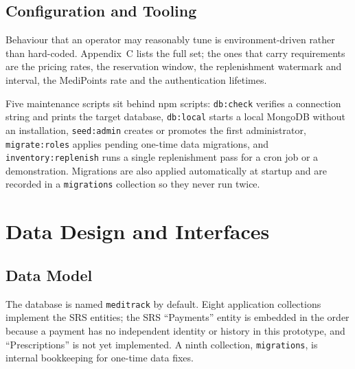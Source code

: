 \documentclass[11pt,a4paper]{article}
\begin{document}
\subsection{Configuration and Tooling}
Behaviour that an operator may reasonably tune is environment-driven rather than
hard-coded. Appendix~C lists the full set; the ones that carry requirements are the
pricing rates, the reservation window, the replenishment watermark and interval, the
MediPoints rate and the authentication lifetimes.

Five maintenance scripts sit behind npm scripts: \texttt{db:check} verifies a
connection string and prints the target database, \texttt{db:local} starts a local
MongoDB without an installation, \texttt{seed:admin} creates or promotes the first
administrator, \texttt{migrate:roles} applies pending one-time data migrations, and
\texttt{inventory:replenish} runs a single replenishment pass for a cron job or a
demonstration. Migrations are also applied automatically at startup and are recorded
in a \texttt{migrations} collection so they never run twice.

\section{Data Design and Interfaces}

\subsection{Data Model}
The database is named \texttt{meditrack} by default. Eight application collections
implement the SRS entities; the SRS ``Payments'' entity is embedded in the order because
a payment has no independent identity or history in this prototype, and
``Prescriptions'' is not yet implemented. A ninth collection, \texttt{migrations}, is
internal bookkeeping for one-time data fixes.
\end{document}
